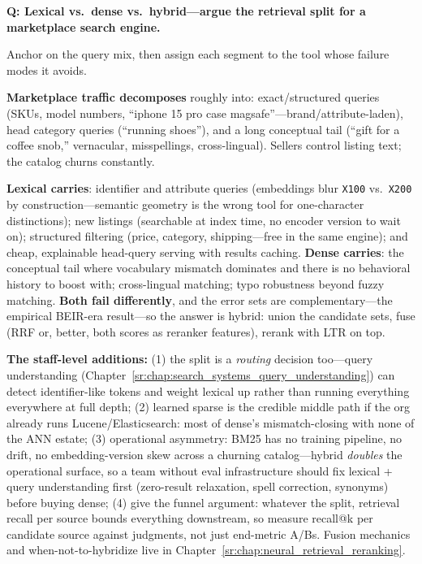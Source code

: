 \begin{interviewq}
\textbf{Q: Lexical vs.\ dense vs.\ hybrid---argue the retrieval split for a marketplace search engine.}

 \quad {} \quad \badgefreq{\freqhigh}

\stronganswer

Anchor on the query mix, then assign each segment to the tool whose failure modes it avoids.

\textbf{Marketplace traffic decomposes} roughly into: exact/structured queries (SKUs, model numbers, ``iphone 15 pro case magsafe''---brand/attribute-laden), head category queries (``running shoes''), and a long conceptual tail (``gift for a coffee snob,'' vernacular, misspellings, cross-lingual). Sellers control listing text; the catalog churns constantly.

\textbf{Lexical carries}: identifier and attribute queries (embeddings blur \texttt{X100} vs.\ \texttt{X200} by construction---semantic geometry is the wrong tool for one-character distinctions); new listings (searchable at index time, no encoder version to wait on); structured filtering (price, category, shipping---free in the same engine); and cheap, explainable head-query serving with results caching. \textbf{Dense carries}: the conceptual tail where vocabulary mismatch dominates and there is no behavioral history to boost with; cross-lingual matching; typo robustness beyond fuzzy matching. \textbf{Both fail differently}, and the error sets are complementary---the empirical BEIR-era result---so the answer is hybrid: union the candidate sets, fuse (RRF or, better, both scores as reranker features), rerank with LTR on top.

\textbf{The staff-level additions:} (1) the split is a \emph{routing} decision too---query understanding (Chapter~\ref{sr:chap:search_systems_query_understanding}) can detect identifier-like tokens and weight lexical up rather than running everything everywhere at full depth; (2) learned sparse is the credible middle path if the org already runs Lucene/Elasticsearch: most of dense's mismatch-closing with none of the ANN estate; (3) operational asymmetry: BM25 has no training pipeline, no drift, no embedding-version skew across a churning catalog---hybrid \emph{doubles} the operational surface, so a team without eval infrastructure should fix lexical + query understanding first (zero-result relaxation, spell correction, synonyms) before buying dense; (4) give the funnel argument: whatever the split, retrieval recall per source bounds everything downstream, so measure recall@k per candidate source against judgments, not just end-metric A/Bs. Fusion mechanics and when-not-to-hybridize live in Chapter~\ref{sr:chap:neural_retrieval_reranking}.


\end{interviewq}
